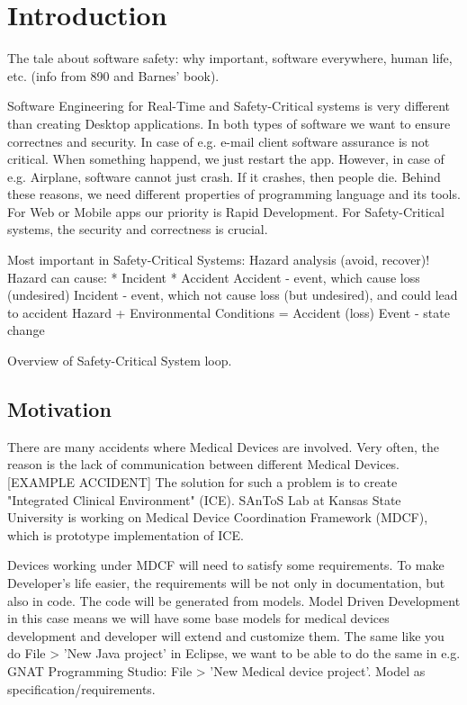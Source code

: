
\cleardoublepage


\chapter{Introduction}
\label{introduction}

The tale about software safety: why important, software everywhere, human life, etc. (info from 890 and Barnes' book).

Software Engineering for Real-Time and Safety-Critical systems is very different than creating Desktop applications. In both types of software we want to ensure correctnes and security. In case of e.g. e-mail client software assurance is not critical. When something happend, we just restart the app. However, in case of e.g. Airplane, software cannot just crash. If it crashes, then people die. Behind these reasons, we need different properties of programming language and its tools. For Web or Mobile apps our priority is Rapid Development. For Safety-Critical systems, the security and correctness is crucial.


Most important in Safety-Critical Systems: Hazard analysis (avoid, recover)!
Hazard can cause:
	* Incident
	* Accident
Accident - event, which cause loss (undesired)
Incident - event, which not cause loss (but undesired), and could lead to accident
Hazard + Environmental Conditions = Accident (loss)
Event - state change

Overview of Safety-Critical System loop.

\section{Motivation}
\label{introduction:motivation}
There are many accidents where Medical Devices are involved. Very often, the reason is the lack of communication between different Medical Devices. [EXAMPLE ACCIDENT]
The solution for such a problem is to create "Integrated Clinical Environment" (ICE). SAnToS Lab at Kansas State University is working on Medical Device Coordination Framework (MDCF), which is prototype implementation of ICE.  

Devices working under MDCF will need to satisfy some requirements. To make Developer's life easier, the requirements will be not only in documentation, but also in code. The code will be generated from models.
Model Driven Development in this case means we will have some base models for medical devices development and developer will extend and customize them. The same like you do File > 'New Java project' in Eclipse, we want to be able to do the same in e.g. GNAT Programming Studio: File > 'New Medical device project'.
Model as specification/requirements.

